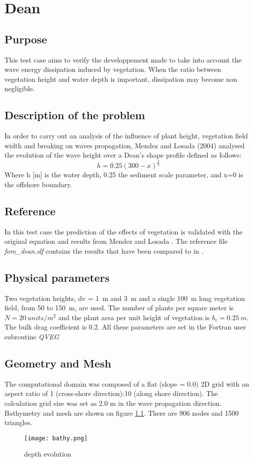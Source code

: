\chapter{Dean}
%

%
\section{Purpose}
%
This test case aims to verify the developpement made to take into account the wave energy dissipation induced by vegetation. When the ratio between vegetation height and water depth is important, dissipation may become non negligible.
%
\section{Description of the problem}
%
In order to carry out an analysis of the influence of plant height, vegetation field width and breaking on waves propagation, Mendez and Losada (2004) analysed the evolution of the wave height over a Dean’s shape profile \cite{Dean1991} defined as follows:
$$
h=0.25(300-x)^\frac{2}{3}
$$
Where h [m] is the water depth, 0.25 the sediment scale parameter, and x=0 is the offshore boundary.

\section{Reference}
%
In this test case the prediction of the effects of vegetation is validated with the original equation and results from Mendez and Losada  \cite{Mendez2004}.
The reference file {\it fom\_dean.slf} contains the results that have been compared to \cite{Mendez2004} in \cite{Bacchi2014}.

\section{Physical parameters}
%
Two vegetation heights, dv = 1~m and 3~m and a single 100~m long vegetation field, from 50 to 150~m, are used. The number of plants per square meter is $N = 20~units/m^2$ and the plant area per unit height of vegetation is $b_v = 0.25~m.$ The bulk drag coefficient is 0.2. All these parameters are set in the Fortran user subroutine {\it QVEG}

\section{Geometry and Mesh}
%
The computational domain was composed of a flat (slope = 0.0) 2D grid with an aspect ratio of 1 (cross-shore direction):10 (along shore direction). The calculation grid size was set as 2.0 m in the wave propagation direction.
Bathymetry and mesh are shown on figure \ref{bathydean}. There are 906 nodes and 1500 triangles.
\begin{figure} [!h]
\centering
\texttt{[image: bathy.png]}
 \caption{depth evolution}
\label{bathydean}
\end{figure}

